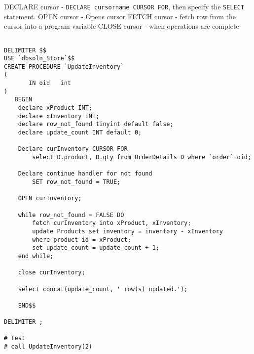 \documentclass{article}
\begin{document}
 \begin{outline}[enumerate]
 	\1 DECLARE cursor 	- \texttt{DECLARE cursorname CURSOR FOR}, then specify the \texttt{SELECT} statement.  
	\1 OPEN cursor	 	- Opens cursor
	\1 FETCH cursor	- fetch row from the cursor into a program variable
	\1 CLOSE cursor 	- when operations are complete
 \end{outline}
 
  
\begin{lstlisting}[frame=single]  

DELIMITER $$
USE `dbsoln_Store`$$
CREATE PROCEDURE `UpdateInventory` 
(
       IN oid 	int		
)
   BEGIN
	declare xProduct INT;
	declare xInventory INT;
    declare row_not_found tinyint default false;
	declare update_count INT default 0;
    
	Declare curInventory CURSOR FOR
		select D.product, D.qty from OrderDetails D where `order`=oid;
	
    Declare continue handler for not found
		SET row_not_found = TRUE;
        
	OPEN curInventory;
    
    while row_not_found = FALSE DO
		fetch curInventory into xProduct, xInventory;
        update Products set inventory = inventory - xInventory
        where product_id = xProduct;
        set update_count = update_count + 1;
	end while;
	
    close curInventory;

	select concat(update_count, ' row(s) updated.');

	END$$

DELIMITER ;

# Test 
# call UpdateInventory(2)
\end{lstlisting} 




 
\end{document}
